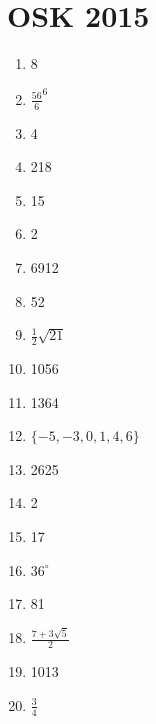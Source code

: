 \section*{OSK 2015}
\begin{enumerate}
	\item 8
	\item $\frac{56}{6}^6$
	\item 4
	\item 218
	\item 15
	\item 2
	\item 6912
	\item 52
	\item $\frac{1}{2}\sqrt{21}$
	\item 1056
	\item 1364
	\item $\{-5,-3,0,1,4,6\}$
	\item 2625
	\item 2
	\item 17
	\item $36^{\circ}$
	\item 81
	\item $\frac{7+3\sqrt{5}}{2}$
	\item 1013
	\item $\frac{3}{4}$
\end{enumerate}